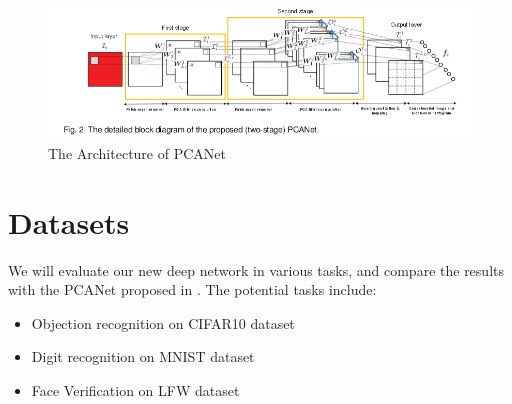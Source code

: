 \documentclass{article} %
\begin{document}

\begin{figure}[h]
\vspace{-15pt} \centering
\includegraphics[scale=1.7,width=15cm]{pcanetstructure.png}
\vspace{-20pt}\caption{The Architecture of PCANet}\label{Figure: bspline}
\end{figure}




\section{Datasets}
We will evaluate our new deep network in various tasks, and compare the results with the PCANet proposed in \cite{chan2015pcanet}. The potential tasks include:
\begin{itemize}
	\item Objection recognition on CIFAR10 dataset
	\item Digit recognition on MNIST dataset
	\item Face Verification on LFW dataset
\end{itemize}

\end{document}
